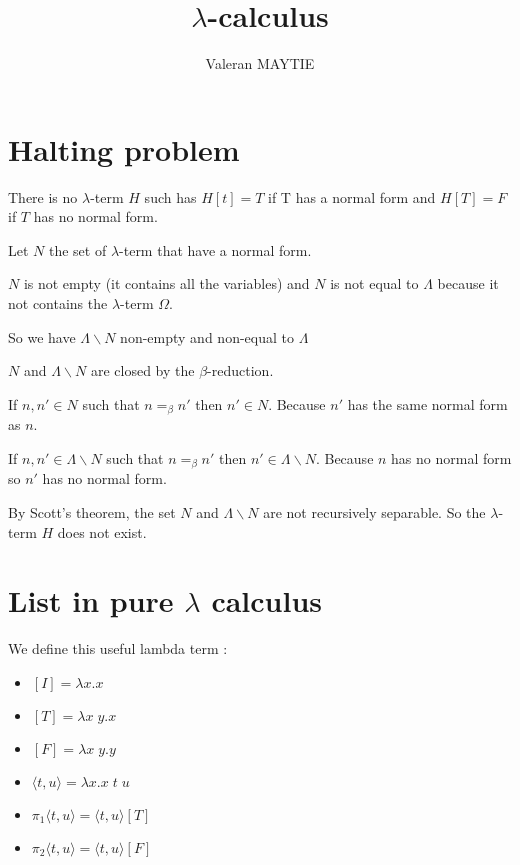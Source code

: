 \documentclass{article}
\date{}
\title{$\lambda$-calculus}
\author{Valeran MAYTIE}
\theoremstyle{plain}
\begin{document}
  \maketitle

  \section*{Halting problem}

  \begin{center}
    There is no $\lambda$-term $H$ such has $H[t] = T$ if T has a normal
    form and $H[T] = F$ if $T$ has no normal form.
  \end{center}

  Let $N$ the set of $\lambda$-term that have a normal form.

  $N$ is not empty (it contains all the variables) and $N$ is not equal to
  $\Lambda$ because it not contains the $\lambda$-term $\Omega$.

  So we have $\Lambda \backslash N$ non-empty and non-equal to $\Lambda$

  $N$ and $\Lambda \backslash N$ are closed by the $\beta$-reduction.

  If $n, n' \in N$ such that $n =_\beta n'$ then $n' \in N$. Because $n'$
  has the same normal form as $n$.

  If $n, n' \in \Lambda \backslash N$ such that $n =_\beta n'$ then $n' \in
  \Lambda \backslash N$. Because $n$ has no normal form so $n'$ has no
  normal form.

  By Scott's theorem, the set $N$ and $\Lambda \backslash N$ are not recursively
  separable. So the $\lambda$-term $H$ does not exist.

  \section*{List in pure $\lambda$ calculus}

  We define this useful lambda term :

  \begin{multicols}{2}
    \begin{itemize}
      \item $[I] = \lambda x.x$
      \item $[T] = \lambda x\;y.x$
      \item $[F] = \lambda x\;y.y$
    \end{itemize}
    \columnbreak
    \begin{itemize}
      \item $\langle t, u \rangle = \lambda x. x\;t\;u$
      \item $\pi_1 \langle t, u \rangle = \langle t, u \rangle [T]$
      \item $\pi_2 \langle t, u \rangle = \langle t, u \rangle [F]$
    \end{itemize}
  \end{multicols}
\end{document}
